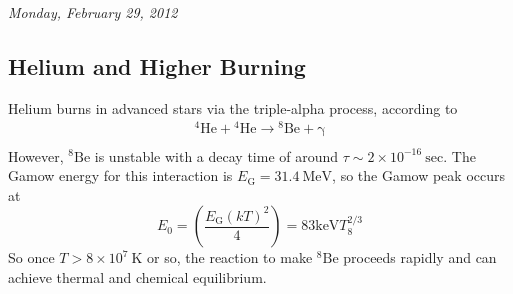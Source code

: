 \documentclass[10pt]{article}
\numberwithin{equation}{section}
\newcommand{\n}{\noindent}
\begin{document}
    \n \textit{Monday, February 29, 2012}
    \subsection{Helium and Higher Burning}
    \label{sec:helium-burning}

    Helium burns in advanced stars via the triple-alpha process,
    according to
    \begin{align}
      \label{eq:264}
      \mathrm{{}^4He+{}^4He\to{}^8Be+\gamma}\\
    \end{align}
    However, $\mathrm{{}^8Be}$ is unstable with a decay time of around
    $\tau\sim 2\times 10^{-16}\ \mathrm{sec}$.  The Gamow energy for
    this interaction is $E_{\mathrm{G}}=31.4\ \mathrm{MeV}$, so the
    Gamow peak occurs at
    \begin{equation}
      \label{eq:265}
      E_0=\left(\frac{E_{\mathrm{G}}(kT)^2}{4}\right)=83\mathrm{keV}T_8^{2/3}
    \end{equation}
    So once $T>8\times 10^7\ \mathrm{K}$ or so, the reaction to make
    $\mathrm{{}^8Be}$ proceeds rapidly and can achieve thermal and
    chemical equilibrium.\\
\end{document}
